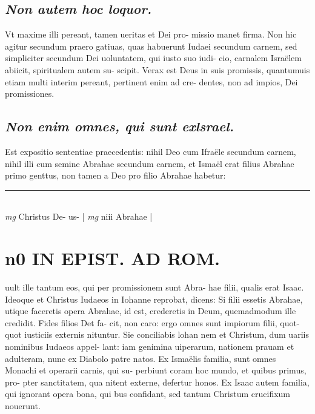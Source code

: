 \documentclass{article}
\begin{document}
\begin{pages}
\subsection*{\textit{Non autem hoc loquor. }}\pstart Vt maxime illi pereant, tamen ueritas et Dei pro- missio manet firma. Non hic agitur secundum praero gatiuas, quas habuerunt Iudaei secundum carnem, sed simpliciter secundum Dei uoluntatem, qui iusto suo iudi- cio, carnalem Israëlem abiicit, spiritualem autem su- scipit. Verax est Deus in suis promissis, quantumuis etiam multi interim pereant, pertinent enim ad cre- dentes, non ad impios, Dei promissiones.   \pend
{}
{}
\subsection*{\textit{Non enim omnes, qui sunt exlsrael. }}\pstart Est expositio sententiae praecedentis: nihil Deo cum Ifraële secundum carnem, nihil illi cum semine Abrahae secundum carnem, et Ismaël erat filius Abrahae primo genttus, non tamen a Deo pro filio Abrahae habetur:  \pend\pstart  \pend
\vspace{0.5cm}\noindent
\vspace{0.2cm}\rule{1cm}{0.2pt}\\ 
\hspace{0.2cm}\textit{mg}
\footnotesize Christus De- us- 
\normalsize| 
\hspace{0.2cm}\textit{mg}
\footnotesize niii Abrahae 
\normalsize| 
\section*{n0 IN EPIST. AD ROM.  }
\marginpar{[ p.]}\pstart uult ille tantum eos, qui per promissionem sunt Abra- hae filii, qualis erat Isaac. Ideoque et Christus Iudaeos in Iohanne reprobat, dicens: Si filii essetis Abrahae, utique faceretis opera Abrahae, id est, crederetis in Deum, quemadmodum ille credidit. Fides filios Det fa- cit, non caro: ergo omnes sunt impiorum filii, quot- quot iusticiis externis nituntur. Sie conciliabis lohan nem et Christum, dum uariis nominibus Iudaeos appel- lant: iam genimina uiperarum, nationem prauam et adulteram, nunc ex Diabolo patre natos. Ex Ismaëlis familia, sunt omnes Monachi et operarii carnis, qui su- perbiunt coram hoc mundo, et quibus primus, pro- pter sanctitatem, qua nitent externe, defertur honos.  Ex Isaac autem familia, qui ignorant opera bona, qui bus confidant, sed tantum Christum crucifixum nouerunt.  \pend
{}
{}

\end{pages}
\end{document}
